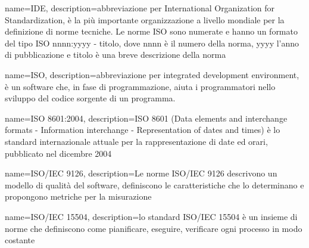 {
	name=IDE,
	description={abbreviazione per International Organization for Standardization, è la più importante organizzazione a livello mondiale per la definizione di norme tecniche. Le norme ISO sono numerate e hanno un formato del tipo ISO nnnn:yyyy - titolo, dove nnnn è il numero della norma, yyyy l'anno di pubblicazione e titolo è una breve descrizione della norma}
}


{
	name=ISO,
	description={abbreviazione per  integrated development environment, è un software che, in fase di programmazione, aiuta i programmatori nello sviluppo del codice sorgente di un programma.}
}

{
	name=ISO 8601:2004,
	description={ISO 8601 (Data elements and interchange formats - Information interchange - Representation of dates and times) è lo standard internazionale attuale per la rappresentazione di date ed orari, pubblicato nel dicembre 2004}
}

{
	name=ISO/IEC 9126,
	description={Le norme ISO/IEC 9126 descrivono un modello di qualità del software, definiscono le caratteristiche che lo determinano e propongono metriche per la misurazione}
}

{
	name=ISO/IEC 15504,
	description={lo standard ISO/IEC 15504 è un insieme di norme che definiscono come pianificare, eseguire, verificare ogni processo in modo costante}
}